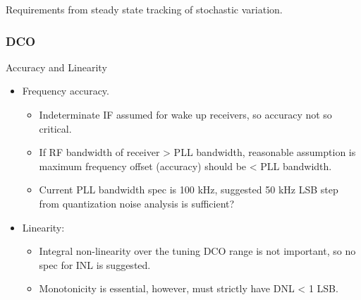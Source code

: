 \documentclass[t, screen, aspectratio=43]{beamer}
\begin{document}
\begin{frame}
\begin{block}{Requirements from steady state tracking of stochastic variation.}
\begin{minipage}{5cm}
		\end{minipage}%
	\end{block}
\end{frame}

\begin{frame}
	\frametitle{DCO}
	\begin{block}{Accuracy and Linearity}
		\vspace{-.2em}
		\begin{itemize}
			\footnotesize
			\item Frequency accuracy.
				\begin{itemize}
					\scriptsize			
					\item Indeterminate IF assumed for wake up receivers, so accuracy not so critical.
					\item If RF bandwidth of receiver > PLL bandwidth, reasonable assumption is maximum frequency offset (accuracy) should be < PLL bandwidth.
					\item Current PLL bandwidth spec is 100 kHz, suggested 50 kHz LSB step from quantization noise analysis is sufficient?
				\end{itemize} 	
			\item Linearity:
			\begin{itemize}
				\scriptsize			
				\item Integral non-linearity over the tuning DCO range is not important, so no spec for INL is suggested.
				\item Monotonicity is essential, however, must strictly have DNL < 1 LSB.
			\end{itemize} 
		\end{itemize}  
	\end{block}
\end{frame}

\end{document}
